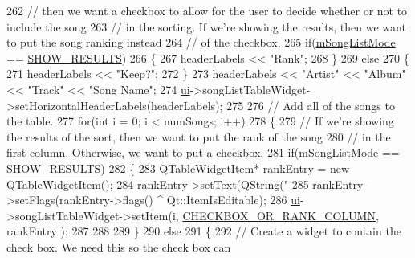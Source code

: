 \begin{DoxyCode}
262     \textcolor{comment}{// then we want a checkbox to allow for the user to decide whether or not to include the song}
263     \textcolor{comment}{// in the sorting. If we're showing the results, then we want to put the song ranking instead}
264     \textcolor{comment}{// of the checkbox.}
265     \textcolor{keywordflow}{if}(\mbox{\hyperlink{class_song_list_viewer_window_a1c242af144718150837feff19386dc73}{mSongListMode}} == \mbox{\hyperlink{class_song_list_viewer_window_a6f23a68c416173f6b571a2cc4990a927a7fbcaf0d5c1145332e50928f877040b4}{SHOW\_RESULTS}})
266     \{
267         headerLabels << \textcolor{stringliteral}{"Rank"};
268     \}
269     \textcolor{keywordflow}{else}
270     \{
271         headerLabels << \textcolor{stringliteral}{"Keep?"};
272     \}
273     headerLabels << \textcolor{stringliteral}{"Artist"} << \textcolor{stringliteral}{"Album"} << \textcolor{stringliteral}{"Track"} << \textcolor{stringliteral}{"Song Name"};
274     \mbox{\hyperlink{class_song_list_viewer_window_ac24fa09133b92a7b4cbd757f9b84258d}{ui}}->songListTableWidget->setHorizontalHeaderLabels(headerLabels);
275 
276     \textcolor{comment}{// Add all of the songs to the table.}
277     \textcolor{keywordflow}{for}(\textcolor{keywordtype}{int} i = 0; i < numSongs; i++)
278     \{
279         \textcolor{comment}{// If we're showing the results of the sort, then we want to put the rank of the song}
280         \textcolor{comment}{// in the first column. Otherwise, we want to put a checkbox.}
281         \textcolor{keywordflow}{if}(\mbox{\hyperlink{class_song_list_viewer_window_a1c242af144718150837feff19386dc73}{mSongListMode}} == \mbox{\hyperlink{class_song_list_viewer_window_a6f23a68c416173f6b571a2cc4990a927a7fbcaf0d5c1145332e50928f877040b4}{SHOW\_RESULTS}})
282         \{
283             QTableWidgetItem* rankEntry = \textcolor{keyword}{new} QTableWidgetItem();
284             rankEntry->setText(QString(\textcolor{stringliteral}{"%
285             rankEntry->setFlags(rankEntry->flags() ^ Qt::ItemIsEditable);
286             \mbox{\hyperlink{class_song_list_viewer_window_ac24fa09133b92a7b4cbd757f9b84258d}{ui}}->songListTableWidget->setItem(i, \mbox{\hyperlink{songlistviewerwindow_8h_a43772c536452cd8ed0af845b585487bf}{CHECKBOX\_OR\_RANK\_COLUMN}}, rankEntry
      );
287 
288 
289         \}
290         \textcolor{keywordflow}{else}
291         \{
292             \textcolor{comment}{// Create a widget to contain the check box. We need this so the check box can}
}
\end{DoxyCode}
